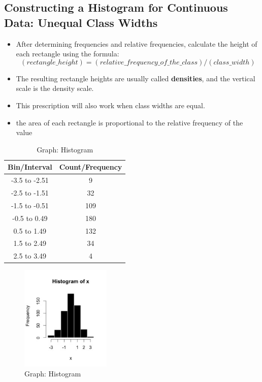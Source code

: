 \subsection{Constructing a Histogram for Continuous Data: Unequal Class Widths}
\begin{itemize}
    \item After determining frequencies and relative frequencies, calculate the height of each rectangle using the formula:
    \begin{equation}
        (rectangle\_height) = (relative\_frequency\_of\_the\_class) / (class\_width)
    \end{equation}
    \item The resulting rectangle heights are usually called \textbf{densities}, and the vertical scale is the density scale. 
    \item This prescription will also work when class widths are equal. 
    \item the area of each rectangle is proportional to the relative frequency of the value
\end{itemize}

\begin{table}[H]
    \begin{minipage}{0.45\textwidth}
        \centering
        \begin{tabular}{|c|c|}
            \hline
            Bin/Interval & Count/Frequency \\ \hline
            -3.5 to -2.51 & 9 \\ \hline
            -2.5 to -1.51 & 32 \\ \hline
            -1.5 to -0.51 & 109 \\ \hline
            -0.5 to 0.49 & 180 \\ \hline
            0.5 to 1.49 & 132 \\ \hline
            1.5 to 2.49 & 34 \\ \hline
            2.5 to 3.49 & 4 \\ \hline
        \end{tabular}
        \caption{Data: Histogram}
    \end{minipage}
    \hfill
    \begin{minipage}{0.45\textwidth}
        \begin{figure}[H]
            \centering
            \includegraphics[height=5cm]{Pictures/data/data_histogram.jpg}
            \caption{Graph: Histogram}
        \end{figure}
    \end{minipage}
\end{table}


